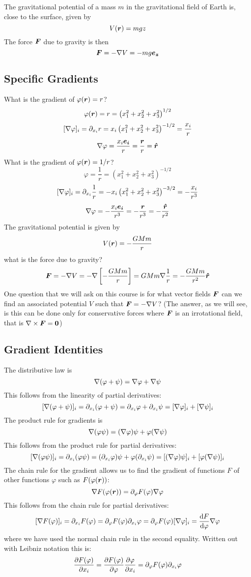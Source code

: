 \documentclass{article}
\newcommand{\pdvx}[1]{\partial_{x_{#1}}}
\begin{document}
    \example
    The gravitational potential of a mass \(m\) in the gravitational field of Earth is, close to the surface, given by
    \[V(\bm{r}) = mgz\]
    The force \(\bm{F}\) due to gravity is then
    \[\bm{F} = -\nabla V = -mg\bm{e_{z}}\]
    
    \subsection{Specific Gradients}
    What is the gradient of \(\varphi(\bm{r}) = r\)?
    \[\varphi(\bm{r}) = r = \left(x_1^2 + x_2^2 + x_3^2\right)^{1/2}\]
    \[[\grad\varphi]_i = \pdvx i r = x_i\left(x_1^2 + x_2^2 + x_3^2\right)^{-1/2} = \frac{x_i}{r}\]
    \[\nabla\varphi = \frac{x_i\bm{e_{i}}}{r} = \frac{\bm{r}}{r} = \bm{\hat{r}}\]
    What is the gradient of \(\varphi(\bm{r}) = 1/r\)?
    \[\varphi = \frac{1}{r} = \left(x_1^2 + x_2^2 + x_3^2\right)^{-1/2}\]
    \[[\grad\varphi]_i = \pdvx i \frac{1}{r} = -x_i\left(x_1^2 + x_2^2 + x_3^2\right)^{-3/2} = -\frac{x_i}{r^3}\]
    \[\nabla\varphi = -\frac{x_i\bm{e_{i}}}{r^3} = -\frac{\bm{r}}{r^3} = -\frac{\bm{\hat{r}}}{r^2}\]
    \example
    The gravitational potential is given by
    \[V(\bm{r}) = -\frac{GMm}{r}\]
    what is the force due to gravity?
    \[\bm{F} = -\nabla V = -\nabla\left[-\frac{GMm}{r}\right] = GMm\nabla\frac{1}{r} = -\frac{GMm}{r^2}\bm{\hat{r}}\]
    One question that we will ask on this course is for what vector fields \(\bm{F}\) can we find an associated potential \(V\) such that \(\bm{F} = -\nabla V\)?
    (The answer, as we will see, is this can be done only for conservative forces where \(\bm{F}\) is an irrotational field, that is \(\nabla\times\bm{F} = \bm{0}\))
    
    \subsection{Gradient Identities}
    The distributive law is
    \[\nabla(\varphi + \psi) = \nabla\varphi + \nabla\psi\]
    This follows from the linearity of partial derivatives:
    \[[\grad(\varphi + \psi)]_i = \pdvx i(\varphi + \psi) = \pdvx i\varphi + \pdvx i\psi = [\grad\varphi]_i + [\grad\psi]_i\]
    The product rule for gradients is
    \[\nabla(\varphi\psi) = (\nabla\varphi)\psi + \varphi(\nabla\psi)\]
    This follows from the product rule for partial derivatives:
    \[[\grad(\varphi\psi)]_i = \pdvx i(\varphi\psi) = (\pdvx i\varphi)\psi + \varphi(\pdvx i\psi) = [(\grad\varphi)\psi]_i + [\varphi(\grad\psi)]_i\]
    The chain rule for the gradient allows us to find the gradient of functions \(F\) of other functions \(\varphi\) such as \(F(\varphi(\bm{r}))\):
    \[\nabla F(\varphi(\bm{r})) = \partial_\varphi F(\varphi)\nabla\varphi\]
    This follows from the chain rule for partial derivatives:
    \[[\grad F(\varphi)]_i = \pdvx i F(\varphi) = \partial_\varphi F(\varphi)\pdvx i\varphi = \partial_\varphi F(\varphi)[\grad\varphi]_i = \dv{F}{\varphi}\grad\varphi\]
    where we have used the normal chain rule in the second equality.
    Written out with Leibniz notation this is:
    \[\pdv{F(\varphi)}{x_i} = \pdv{F(\varphi)}{\varphi}\pdv{\varphi}{x_i} = \partial_\varphi F(\varphi)\pdvx i\varphi\]
    
\end{document}
